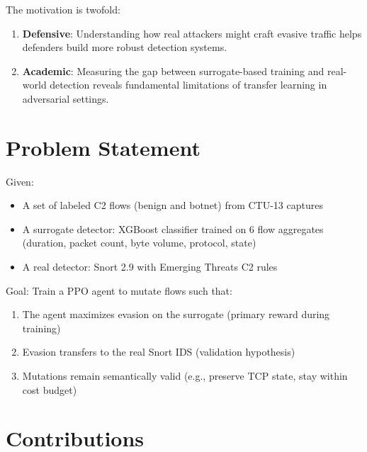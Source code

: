 \documentclass[12pt,a4paper]{report}
\begin{document}
The motivation is twofold:
\begin{enumerate}
  \item \textbf{Defensive}: Understanding how real attackers might craft evasive traffic helps defenders build more robust detection systems.
  \item \textbf{Academic}: Measuring the gap between surrogate-based training and real-world detection reveals fundamental limitations of transfer learning in adversarial settings.
\end{enumerate}

\section{Problem Statement}

Given:
\begin{itemize}
  \item A set of labeled C2 flows (benign and botnet) from CTU-13 captures
  \item A surrogate detector: XGBoost classifier trained on 6 flow aggregates (duration, packet count, byte volume, protocol, state)
  \item A real detector: Snort 2.9 with Emerging Threats C2 rules
\end{itemize}

Goal: Train a PPO agent to mutate flows such that:
\begin{enumerate}
  \item The agent maximizes evasion on the surrogate (primary reward during training)
  \item Evasion transfers to the real Snort IDS (validation hypothesis)
  \item Mutations remain semantically valid (e.g., preserve TCP state, stay within cost budget)
\end{enumerate}

\section{Contributions}
\end{document}
